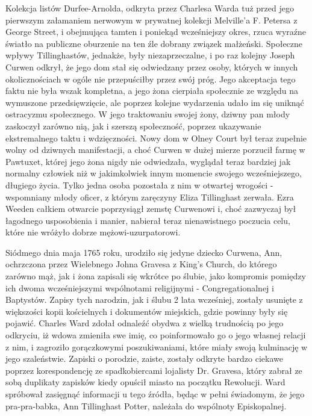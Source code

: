 Kolekcja listów Durfee-Arnolda, odkryta przez Charlesa Warda tuż przed jego pierwszym załamaniem nerwowym w prywatnej kolekcji Melville'a F. Petersa z George Street, i obejmująca tamten i poniekąd wcześniejszy okres, rzuca wyraźne światło na publiczne oburzenie na ten źle dobrany związek małżeński. Społeczne wpływy Tillinghastów, jednakże, były niezaprzeczalne, i po raz kolejny Joseph Curwen odkrył, że jego dom stał się odwiedzany przez osoby, których w innych okolicznościach w ogóle nie przepuściłby przez swój próg.  Jego akceptacja tego faktu nie była wszak kompletna, a jego żona cierpiała społecznie ze względu na wymuszone przedsięwzięcie, ale poprzez kolejne wydarzenia udało im się uniknąć ostracyzmu społecznego. W jego traktowaniu swojej żony, dziwny pan młody zaskoczył zarówno nią, jak i szerszą społeczność, poprzez ukazywanie ekstremalnego taktu i wdzięczności. Nowy dom w Olney Court był teraz zupełnie wolny od dziwnych manifestacji, a choć Curwen w dużej mierze porzucił farmę w Pawtuxet, której jego żona nigdy nie odwiedzała, wyglądał teraz bardziej jak normalny człowiek niż w jakimkolwiek innym momencie swojego wcześniejszego, długiego życia. Tylko jedna osoba pozostała z nim w otwartej wrogości - wspomniany młody oficer, z którym zaręczyny Eliza Tillinghast zerwała. Ezra Weeden całkiem otwarcie poprzysiągł zemstę Curwenowi i, choć zazwyczaj był łagodnego usposobienia i manier, nabierał teraz nienawistnego poczucia celu, które nie wróżyło dobrze mężowi-uzurpatorowi.

Siódmego dnia maja 1765 roku, urodziło się jedyne dziecko Curwena, Ann, ochrzczona przez Wielebnego Johna Gravesa z King's Church, do którego zarówno mąż, jak i żona zapisali się wkrótce po ślubie, jako kompromis pomiędzy ich dwoma wcześniejszymi wspólnotami religijnymi - Congregationalnej i Baptystów. Zapisy tych narodzin, jak i ślubu 2 lata wcześniej, zostały usunięte z większości kopii kościelnych i dokumentów miejskich, gdzie powinny były się pojawić. Charles Ward zdołał odnaleźć obydwa z wielką trudnością po jego odkryciu, iż wdowa zmieniła swe imię, co poinformowało go o jego własnej relacji z nim, i zagroziło gorączkowymi poszukiwaniami, które miały swoją kulminację w jego szaleństwie. Zapiski o porodzie, zaiste, zostały odkryte bardzo ciekawe poprzez korespondencję ze spadkobiercami lojalisty Dr. Gravesa, który zabrał ze sobą duplikaty zapisków kiedy opuścił miasto na początku Rewolucji. Ward spróbował zasięgnąć informacji u tego źródła, będąc w pełni świadomym, że jego pra-pra-babka, Ann Tillinghast Potter, należała do wspólnoty Episkopalnej.

